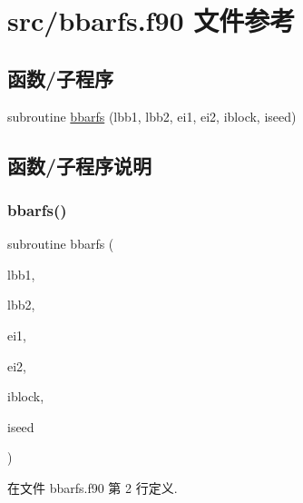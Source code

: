 \hypertarget{bbarfs_8f90}{}\section{src/bbarfs.f90 文件参考}
\label{bbarfs_8f90}
\subsection*{函数/子程序}
\begin{DoxyCompactItemize}
\item 
subroutine \mbox{\hyperlink{bbarfs_8f90_ad1f267f9b3425b9623dd2a870b934e01}{bbarfs}} (lbb1, lbb2, ei1, ei2, iblock, iseed)
\end{DoxyCompactItemize}


\subsection{函数/子程序说明}
\mbox{\label{bbarfs_8f90_ad1f267f9b3425b9623dd2a870b934e01}} 
\subsubsection{\texorpdfstring{bbarfs()}{bbarfs()}}
{\footnotesize\ttfamily subroutine bbarfs (\begin{DoxyParamCaption}\item[{}]{lbb1,  }\item[{}]{lbb2,  }\item[{}]{ei1,  }\item[{}]{ei2,  }\item[{}]{iblock,  }\item[{}]{iseed }\end{DoxyParamCaption})}



在文件 bbarfs.\+f90 第 2 行定义.

